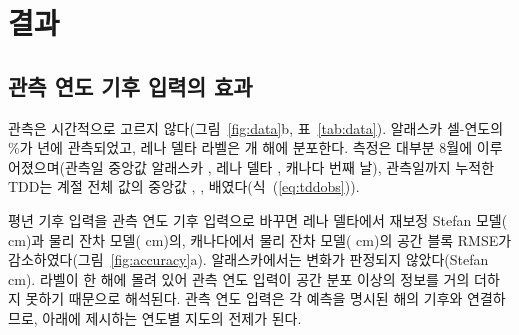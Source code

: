 \section{결과}\label{sec:results}

\subsection{관측 연도 기후 입력의 효과}
관측은 시간적으로 고르지 않다(그림~\ref{fig:data}b, 표~\ref{tab:data}). 알래스카 셀-연도의 \ntopyrshareAk\%가 \ntopyrAk{}년에 관측되었고, 레나 델타 라벨은 \nnyrLe{}개 해에 분포한다. 측정은 대부분 8월에 이루어졌으며(관측일 중앙값 알래스카 \ndoymedAk, 레나 델타 \ndoymedLe, 캐나다 \ndoymedCa{}번째 날), 관측일까지 누적한 TDD는 계절 전체 값의 중앙값 \ntddfracAk, \ntddfracLe, \ntddfracCa{}배였다(식~(\ref{eq:tddobs})).

평년 기후 입력을 관측 연도 기후 입력으로 바꾸면 레나 델타에서 재보정 Stefan 모델(\ndforcLePo{} cm)과 물리 잔차 모델(\ndforcLeRo{} cm)의, 캐나다에서 물리 잔차 모델(\ndforcCaRo{} cm)의 공간 블록 RMSE가 감소하였다(그림~\ref{fig:accuracy}a). 알래스카에서는 변화가 판정되지 않았다(Stefan \ndforcAkPo{} cm). 라벨이 한 해에 몰려 있어 관측 연도 입력이 공간 분포 이상의 정보를 거의 더하지 못하기 때문으로 해석된다. 관측 연도 입력은 각 예측을 명시된 해의 기후와 연결하므로, 아래에 제시하는 연도별 지도의 전제가 된다.


